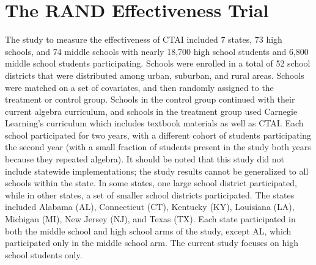 \documentclass[12pt]{article}\usepackage[]{graphicx}\usepackage[]{color}
\begin{document}
\section{The RAND Effectiveness Trial}\label{sec:RANDtrial}
The study to measure the effectiveness of CTAI included 7 states, 73
high schools, and 74 middle schools with nearly 18,700 high school
students and 6,800 middle school students participating. Schools were enrolled in a
total of 52 school districts that were distributed among urban,
suburban, and rural areas. Schools were matched on a set of
covariates, and then randomly assigned to the treatment or control
group. Schools in the control group continued with their current
algebra curriculum, and schools in the treatment group used Carnegie
Learning's curriculum which includes textbook materials as well as
CTAI. Each school participated for two years, with a different cohort
of students participating the second year (with a small fraction of
students present in the study both years because they repeated
algebra). It should be noted that this study did not include statewide
implementations; the study results cannot be generalized to all
schools within the state. In some states, one large school district
participated, while in other states, a set of smaller school districts
participated. The states included Alabama (AL), Connecticut (CT),
Kentucky (KY), Louisiana (LA), Michigan (MI), New Jersey (NJ), and
Texas (TX). Each state participated in both the middle school and high
school arms of the study, except AL, which participated only in the
middle school arm. The current study focuses on high school students
only. %
\end{document}

